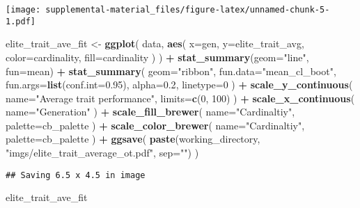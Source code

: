 \documentclass[]{book}
\newenvironment{Shaded}{\begin{snugshade}}{\end{snugshade}}
\newcommand{\DataTypeTok}[1]{\textcolor[rgb]{0.13,0.29,0.53}{#1}}
\newcommand{\DecValTok}[1]{\textcolor[rgb]{0.00,0.00,0.81}{#1}}
\newcommand{\FloatTok}[1]{\textcolor[rgb]{0.00,0.00,0.81}{#1}}
\newcommand{\KeywordTok}[1]{\textcolor[rgb]{0.13,0.29,0.53}{\textbf{#1}}}
\newcommand{\NormalTok}[1]{#1}
\newcommand{\OperatorTok}[1]{\textcolor[rgb]{0.81,0.36,0.00}{\textbf{#1}}}
\newcommand{\StringTok}[1]{\textcolor[rgb]{0.31,0.60,0.02}{#1}}
\begin{document}
\texttt{[image: supplemental-material\_files/figure-latex/unnamed-chunk-5-1.pdf]}

\begin{Shaded}
\begin{Highlighting}[]
\NormalTok{elite_trait_ave_fit <-}\StringTok{ }\KeywordTok{ggplot}\NormalTok{(}
\NormalTok{    data,}
    \KeywordTok{aes}\NormalTok{(}
      \DataTypeTok{x=}\NormalTok{gen,}
      \DataTypeTok{y=}\NormalTok{elite_trait_avg,}
      \DataTypeTok{color=}\NormalTok{cardinality,}
      \DataTypeTok{fill=}\NormalTok{cardinality}
\NormalTok{    )}
\NormalTok{  ) }\OperatorTok{+}
\StringTok{  }\KeywordTok{stat_summary}\NormalTok{(}\DataTypeTok{geom=}\StringTok{"line"}\NormalTok{, }\DataTypeTok{fun=}\NormalTok{mean) }\OperatorTok{+}
\StringTok{  }\KeywordTok{stat_summary}\NormalTok{(}
    \DataTypeTok{geom=}\StringTok{"ribbon"}\NormalTok{,}
    \DataTypeTok{fun.data=}\StringTok{"mean_cl_boot"}\NormalTok{,}
    \DataTypeTok{fun.args=}\KeywordTok{list}\NormalTok{(}\DataTypeTok{conf.int=}\FloatTok{0.95}\NormalTok{),}
    \DataTypeTok{alpha=}\FloatTok{0.2}\NormalTok{,}
    \DataTypeTok{linetype=}\DecValTok{0}
\NormalTok{  ) }\OperatorTok{+}
\StringTok{  }\KeywordTok{scale_y_continuous}\NormalTok{(}
    \DataTypeTok{name=}\StringTok{"Average trait performance"}\NormalTok{,}
    \DataTypeTok{limits=}\KeywordTok{c}\NormalTok{(}\DecValTok{0}\NormalTok{, }\DecValTok{100}\NormalTok{)}
\NormalTok{  ) }\OperatorTok{+}
\StringTok{  }\KeywordTok{scale_x_continuous}\NormalTok{(}
    \DataTypeTok{name=}\StringTok{"Generation"}
\NormalTok{  ) }\OperatorTok{+}
\StringTok{  }\KeywordTok{scale_fill_brewer}\NormalTok{(}
    \DataTypeTok{name=}\StringTok{"Cardinaltiy"}\NormalTok{,}
    \DataTypeTok{palette=}\NormalTok{cb_palette}
\NormalTok{  ) }\OperatorTok{+}
\StringTok{  }\KeywordTok{scale_color_brewer}\NormalTok{(}
    \DataTypeTok{name=}\StringTok{"Cardinaltiy"}\NormalTok{,}
    \DataTypeTok{palette=}\NormalTok{cb_palette}
\NormalTok{  ) }\OperatorTok{+}
\StringTok{  }\KeywordTok{ggsave}\NormalTok{(}
    \KeywordTok{paste}\NormalTok{(working_directory, }\StringTok{"imgs/elite_trait_average_ot.pdf"}\NormalTok{, }\DataTypeTok{sep=}\StringTok{""}\NormalTok{)}
\NormalTok{  )}
\end{Highlighting}
\end{Shaded}

\begin{verbatim}
## Saving 6.5 x 4.5 in image
\end{verbatim}

\begin{Shaded}
\begin{Highlighting}[]
\NormalTok{elite_trait_ave_fit}
\end{Highlighting}
\end{Shaded}
\end{document}
